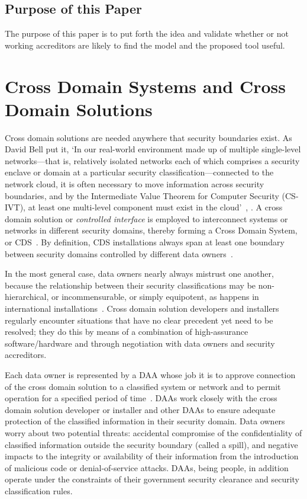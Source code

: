 \documentclass{llncs}
\begin{document}
\subsection{Purpose of this Paper}

The purpose of this paper
is to put forth the idea and validate whether or not working accreditors
are likely to find the model and the proposed tool useful.

\section{Cross Domain Systems and Cross Domain Solutions}

Cross domain solutions are needed anywhere that security boundaries exist.
As David Bell put it, `In our real-world environment made up of multiple
single-level networks---that is, relatively isolated networks each of which
comprises a security enclave or domain at a particular security
classification---connected to the network cloud, it is often necessary to
move information across security boundaries, and by the Intermediate Value
Theorem for Computer Security (CS-IVT), at least one multi-level component
must exist in the cloud'~\cite[]{Bell2005b}, \cite{Loughry2012b}.
A cross domain solution or \emph{controlled interface} is employed to
interconnect systems or networks in different security domains, thereby
forming a Cross Domain System, or CDS~\cite{DCID-6/3a}.  By definition, CDS
installations always span at least one boundary between security domains
controlled by different data owners~\cite{Loughry2010a}.

In the most general case, data owners nearly always mistrust one another,
because the relationship between their security classifications may be
non-hierarch\-ical, or incommensurable, or simply equipotent, as happens in
international
installations~\cite{TSOL_2.5_CMW}.  Cross domain solution developers and installers regularly
encounter situations that have no clear precedent yet need to be resolved;
they do this by means of a combination of high-assurance
software/hardware and through negotiation with data owners and security accreditors.

Each data owner is represented by a DAA whose job it is to approve connection
of the cross domain solution to a classified system or network and to permit
operation for a specified period of
time~\cite{NIST-SP-800-37,NIST-SP-800-53A2,DIACAP,NIST-SP800-53r3}.  DAAs work
closely with the cross domain solution developer or installer and other DAAs to
ensure adequate protection of the classified information in their security domain.
Data owners worry about two potential threats: accidental compromise of the
confidentiality of classified information outside the security boundary (called a
spill), and negative impacts to the integrity or availability of their information
from the introduction of malicious code or denial-of-service attacks.  DAAs, being
people, in addition operate under the constraints of their government security
clearance and security classification rules.
\end{document}
